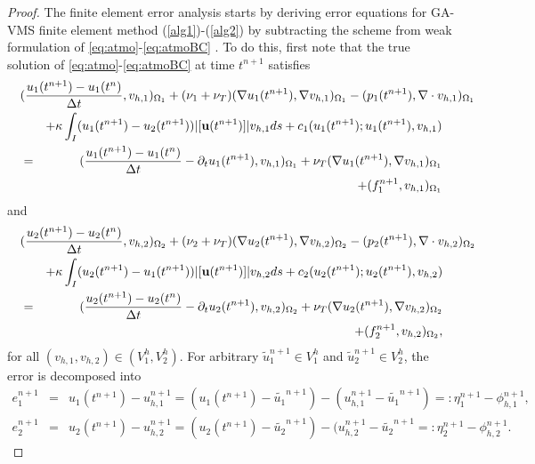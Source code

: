 \documentclass[10pt]{article}%
\numberwithin{equation}{section}
\newcommand{\bff}{{  f}}
\begin{document}
\begin{proof}
The finite element error analysis starts by deriving error equations for GA-VMS finite element method (\ref{alg1})-(\ref{alg2}) by subtracting the scheme from weak formulation of \eqref{eq:atmo}-\eqref{eq:atmoBC} . To do this, first note that the true solution of \eqref{eq:atmo}-\eqref{eq:atmoBC} at time $t^{n+1}$ satisfies
	\begin{eqnarray}
	\lefteqn{(\frac{{u_1(t^{n+1})}-u_{1}(t^{n})}{\Delta t} ,v_{h,1})_{\Omega_1} +(\nu_1+\nu_T)(\nabla  u_{1}(t^{n+1}),\nabla v_{h,1})_{\Omega_1}-(p_1(t^{n+1}),\nabla\cdot v_{h,1})_{\Omega_1}}
	\nonumber\\
	&&+\kappa \int_{I}(u_1(t^{n+1})-u_{2}(t^{n+1}))|[{\bf u}(t^{n+1})]|v_{h,1}ds+ {c_1(u_{1}(t^{n+1});u_{1}(t^{n+1}),v_{h,1})}\nonumber\allowdisplaybreaks\\&=&(\frac{{u_1(t^{n+1})}-u_{1}(t^{n})}{\Delta t}-\partial_{t}u_1(t^{n+1}) ,v_{h,1})_{\Omega_1}+\nu_T(\nabla  u_{1}(t^{n+1}),\nabla v_{h,1})_{\Omega_1}\nonumber\\&&+(\bff_1^{n+1},v_{h,1})_{\Omega_1} \label{err1}
	\end{eqnarray}
	and
	\begin{eqnarray}
	\lefteqn{(\frac{{u_{2}(t^{n+1})}-u_{2}(t^{n})}{\Delta t} ,v_{h,2})_{\Omega_2} +(\nu_2+\nu_T)(\nabla  {u}_{2}(t^{n+1}),\nabla v_{h,2})_{\Omega_2}-(p_2(t^{n+1}),\nabla\cdot v_{h,2})_{\Omega_2}}
	\nonumber\allowdisplaybreaks\\
	&&+\kappa \int_{I}(u_{2}(t^{n+1})-u_1(t^{n+1}))|[{\bf u}(t^{n+1})]|v_{h,2}ds+ {c_2(u_{2}(t^{n+1});u_{2}(t^{n+1}),v_{h,2})}\nonumber\allowdisplaybreaks\\&=&(\frac{{u_{2}(t^{n+1})}-u_{2}(t^{n})}{\Delta t} -\partial_{t}u_2(t^{n+1}),v_{h,2})_{\Omega_2}+\nu_T(\nabla  {u}_{2}(t^{n+1}),\nabla v_{h,2})_{\Omega_2}\nonumber\\&&+(\bff_2^{n+1},v_{h,2})_{\Omega_2}, \label{err2}
	\end{eqnarray}
	for all $(v_{h,1}, v_{h,2}) \in (V_1^h,V_2^h)$. For arbitrary $\tilde{u}_1^{n+1}\in V_1^h$ and $\tilde{u}_2^{n+1}\in V_2^h$, the error is decomposed into
	\begin{eqnarray}
	e_1^{n+1}&=&u_1(t^{n+1})-u_{h,1}^{n+1}=(u_1(t^{n+1})-\tilde{u_1}^{n+1})-(u_{h,1}^{n+1}-\tilde{u_1}^{n+1})=:\eta_1^{n+1}-\phi_{h,1}^{n+1},\nonumber\\
	e_2^{n+1}&=&u_{2}(t^{n+1})-u_{h,2}^{n+1}=(u_{2}(t^{n+1})-\tilde{u_{2}}^{n+1})-(u_{h,2}^{n+1}-\tilde{u_{2}}^{n+1}=:\eta_2^{n+1}-\phi_{h,2}^{n+1}.
	\end{eqnarray}

\end{proof}
\end{document}
